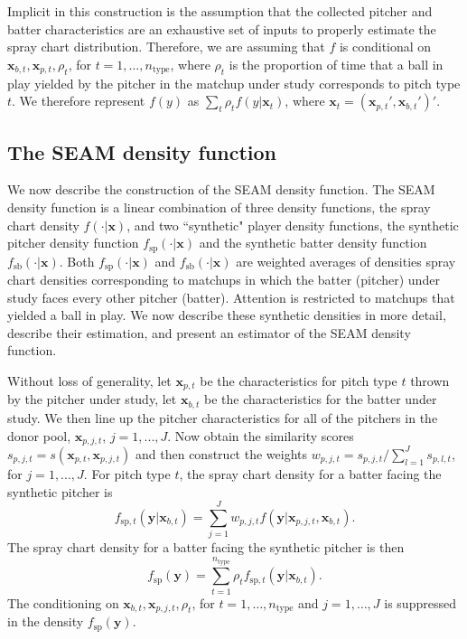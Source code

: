 \documentclass[12pt]{article}
\newcommand{\y}{\textbf{y}}
\newcommand{\x}{\textbf{x}}
\begin{document}
Implicit in this construction is the assumption that the collected pitcher and batter characteristics are an exhaustive set of inputs to properly estimate the spray chart distribution. Therefore, we are assuming that $f$ is conditional on $\x_{b,t}, \x_{p,t}, \rho_t$, for $t = 1,\ldots,n_{\text{type}}$, where $\rho_t$ is the proportion of time that a ball in play yielded by the pitcher in the matchup under study corresponds to pitch type $t$. We therefore represent $f(y)$ as $\sum_t \rho_t f(y|\x_t)$, where $\x_t = (\x_{p,t}', \x_{b,t}')'$.


\subsection{The SEAM density function}

We now describe the construction of the SEAM density function. The SEAM density function is a linear combination of three density functions, the spray chart density $f(\cdot|\textbf{x})$, and two ``synthetic" player density functions, the synthetic pitcher density function $f_{\text{sp}}(\cdot|\textbf{x})$ and the synthetic batter density function $f_{\text{sb}}(\cdot|\textbf{x})$. Both $f_{\text{sp}}(\cdot|\textbf{x})$ and $f_{\text{sb}}(\cdot|\textbf{x})$ are weighted averages of densities spray chart densities corresponding to matchups in which the batter (pitcher) under study faces every other pitcher (batter). Attention is restricted to matchups that yielded a ball in play. We now describe these synthetic densities in more detail, describe their estimation, and present an estimator of the SEAM density function.

Without loss of generality, let $\x_{p,t}$ be the characteristics for pitch type $t$ thrown by the pitcher under study, let $\x_{b,t}$ be the characteristics for the batter under study. We then line up the pitcher characteristics for all of the pitchers in the donor pool, $\x_{p,j,t}$, $j = 1,...,J$. Now obtain the similarity scores $s_{p,j,t} = s(\x_{p,t},\x_{p,j,t})$ and then construct the weights $w_{p,j,t} = s_{p,j,t} / \sum_{l=1}^{J}s_{p,l,t}$, for $j = 1,...,J$. For pitch type $t$, the spray chart density for a batter facing the synthetic pitcher is
\begin{equation} \label{synth-pitch-t}
  f_{\text{sp}, t}(\y|\x_{b,t}) = \sum_{j=1}^J w_{p,j,t}f(\y|\x_{p,j,t},\x_{b,t}).
\end{equation}
The spray chart density for a batter facing the synthetic pitcher is then
\begin{equation} \label{synth-pitch}
  f_{\text{sp}}(\y) = \sum_{t=1}^{n_{\text{type}}} \rho_t f_{\text{sp},t}(\y|\x_{b,t}).
\end{equation}
The conditioning on $\x_{b,t}, \x_{p,j,t}, \rho_t$, for $t = 1,\ldots,n_{\text{type}}$ and $j = 1,\ldots,J$ is suppressed in the density $f_{\text{sp}}(\y)$.
\end{document}
